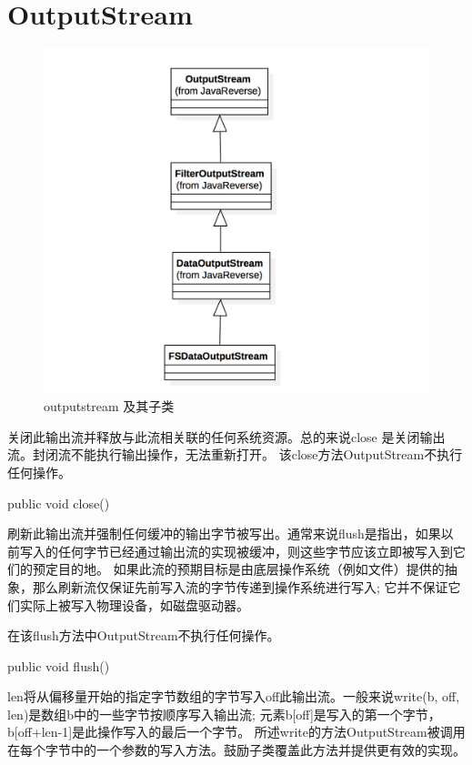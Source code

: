 \section{OutputStream}

\begin{figure}
\centering
\includegraphics[width =1\linewidth]{11.png}
\caption{outputstream 及其子类}
\label{fig:OutputStream}
\end{figure}


关闭此输出流并释放与此流相关联的任何系统资源。总的来说close 是关闭输出流。封闭流不能执行输出操作，无法重新打开。
该close方法OutputStream不执行任何操作。
\begin{java}
public void close()
\end{java}
刷新此输出流并强制任何缓冲的输出字节被写出。通常来说flush是指出，如果以前写入的任何字节已经通过输出流的实现被缓冲，则这些字节应该立即被写入到它们的预定目的地。
如果此流的预期目标是由底层操作系统（例如文件）提供的抽象，那么刷新流仅保证先前写入流的字节传递到操作系统进行写入; 它并不保证它们实际上被写入物理设备，如磁盘驱动器。

在该flush方法中OutputStream不执行任何操作。
\begin{java}
public void flush()
\end{java}
len将从偏移量开始的指定字节数组的字节写入off此输出流。一般来说write(b, off, len)是数组b中的一些字节按顺序写入输出流; 元素b[off]是写入的第一个字节，b[off+len-1]是此操作写入的最后一个字节。
所述write的方法OutputStream被调用在每个字节中的一个参数的写入方法。鼓励子类覆盖此方法并提供更有效的实现。

